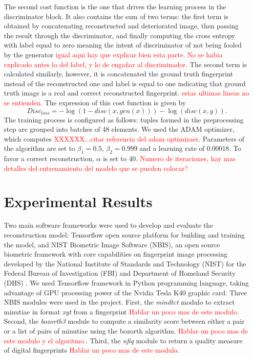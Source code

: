 \documentclass[a4paper,fleqn]{cas-dc}
\begin{document}
The second cost function is the one that drives the learning process in the discriminator block. It also contains the sum of two terms: the first term is obtained by concatenating reconstructed and deteriorated image, then passing the result through the discriminator, and finally computing the cross entropy with label equal to zero meaning the intent of discriminator of not being fooled by the generator \textcolor{red}{igual aqui hay que explicar bien esta parte. No se habia explicado antes lo del label, y lo de engañar al discriminador}. The second term is calculated similarly, however, it is concatenated the ground truth fingerprint instead of the reconstructed one and label is equal to one indicating that ground truth image is a real and correct reconstructed fingerprint. \textcolor{red}{estas ultimas lineas no se entienden.} The expression of this cost function is given by
\begin{equation}
    Disc_{loss} = -\log(1-disc(x,gen(x)))-\log(disc(x,y)).
\end{equation}
The training process is configured as follows: tuples formed in the preprocessing step are grouped into batches of 48 elements. We used the ADAM optimizer, which computes \textcolor{red}{XXXXXX...citar referencia del adam optimizaer}. Parameters of the algorithm are set to $\beta_{1}=0.5$, $\beta_{2}=0.999$ and a learning rate of $0.00018$. To favor a correct reconstruction, $\alpha$ is set to 40.  \textcolor{red}{Numero de iteraciones, hay mas detalles del entrenamiento del modelo que se pueden colocar?}


\section{Experimental Results}\label{sec:ER}
Two main software frameworks were used to develop and evaluate the reconstruction model: Tensorflow open source platform for building and training the model, and NIST Biometric Image Software (NBIS), an open source biometric framework with core capabilities on fingerprint image processing developed by the National Institute of Standards and Technology (NIST) for the Federal Bureau of Investigation (FBI) and Department of Homeland Security (DHS) \cite{NBISWP}. We used Tensorflow framework in Python programming language, taking advantage of GPU processing power of the Nvidia Tesla K40 graphic card. Three NBIS modules were used in the project. First, the \textit{mindtct} modulo to extract minutiae in format \textit{xyt} from a fingerprint \textcolor{red}{Hablar un poco mas de este modulo}. Second, the \textit{bozorth3} module to compute a similarity score between either a pair or a list of pairs of minutiae using the bozorth algorithm. \textcolor{red}{Hablar un poco mas de este modulo y el algoritmo.}. Third, the \textit{nfiq} module to return a quality measure of digital fingerprints \textcolor{red}{Hablar un poco mas de este modulo}. 
\end{document}

